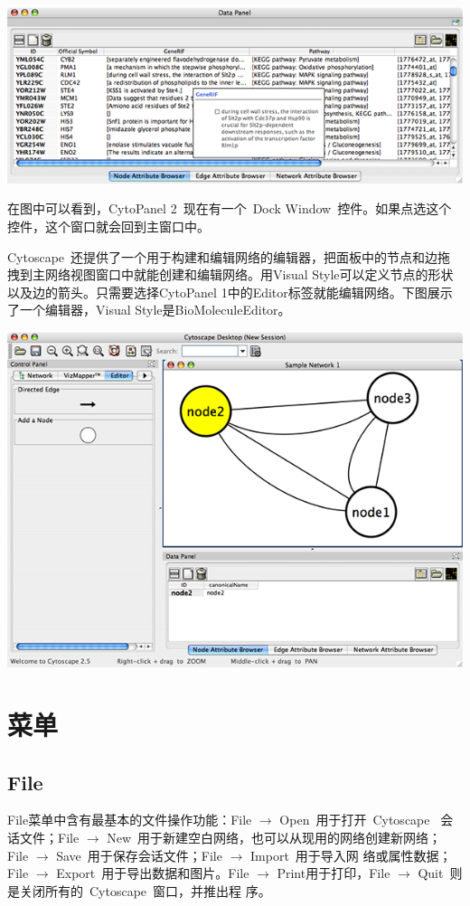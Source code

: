 {\centering
\includegraphics[width=\textwidth]{images/attribute_browser_26.png}
}

在图中可以看到，CytoPanel 2~现在有一个~Dock Window~控件。如果点选这个控件，这个窗口就会回到主窗口中。

Cytoscape~还提供了一个用于构建和编辑网络的编辑器，把面板中的节点和边拖拽到主网络视图窗口中就能创建和编辑网络。用Visual Style可以定义节点的形状以及边的箭头。只需要选择CytoPanel 1中的Editor标签就能编辑网络。下图展示了一个编辑器，Visual Style是BioMoleculeEditor。

{\centering
\includegraphics[width=\textwidth]{images/editor_25.png}}

\section{菜单}
	\subsection{File}
	File菜单中含有最基本的文件操作功能：File $\rightarrow$ Open~用于打开~Cytoscape~
	会话文件；File $\rightarrow$ New~用于新建空白网络，也可以从现用的网络创建新网络；
	File $\rightarrow$ Save~用于保存会话文件；File $\rightarrow$ Import~用于导入网
	络或属性数据；File $\rightarrow$ Export~用于导出数据和图片。File $\rightarrow$ 
	Print用于打印，File $\rightarrow$ Quit~则是关闭所有的~Cytoscape~窗口，并推出程
	序。

